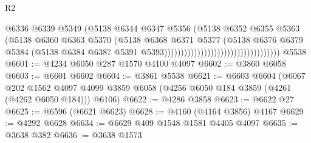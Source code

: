 \begin{lexlean}{R2}
\begin{coremodule}
                                                              @6336
                                                              @6339
                                                              @5349
                                                              (@5138
                                                                @6344
                                                                @6347
                                                                @5356
                                                                (@5138
                                                                  @6352
                                                                  @6355
                                                                  @5363
                                                                  (@5138
                                                                    @6360
                                                                    @6363
                                                                    @5370
                                                                    (@5138
                                                                      @6368
                                                                      @6371
                                                                      @5377
                                                                      (@5138
                                                                        @6376
                                                                        @6379
                                                                        @5384
                                                                        (@5138
                                                                          @6384
                                                                          @6387
                                                                          @5391
                                                                          @5393)))))))))))))))))))))))))))))))))))
    @5538
@6601 := @4234 @6050 @287 @1570 @4100 @4097
@6602 := @3860 @6058
@6603 := @6601 @6602
@6604 := @3861 @5538
@6621 := @6603
    @6604
    (@6067
      @202
      @1562
      @4097
      @4099
      @3859
      @6058
      (@4256 @6050 @184 @3859 (@4261 (@4262 @6050 @184)))
      @6106)
@6622 := @4286 @3858
@6623 := @6622 @27
@6625 := @6596 (@6621 @6623)
@6628 := @4160 (@4164 @3856) @4167
@6629 := @4292 @6628
@6634 := @6629 @409 @1548 @1581 @4405 @4097
@6635 := @3638 @382
@6636 := @3638 @1573

\end{coremodule}
\end{lexlean}
